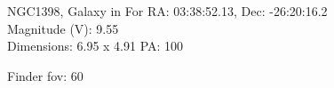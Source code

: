\begin{block}{NGC1398, Galaxy in For}
    RA: 03:38:52.13, Dec: -26:20:16.2 \\ 
    Magnitude (V): 9.55 \\ 
    Dimensions: 6.95 x 4.91 PA: 100 

    Finder fov: 60 
\end{block}
